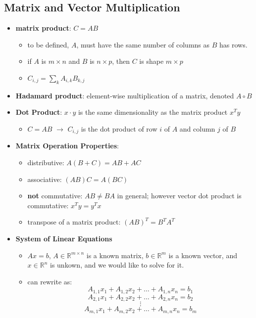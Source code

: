 \subsection{Matrix and Vector Multiplication}
\begin{itemize}
    \item \textbf{matrix product}: $C = AB$
    \begin{itemize}
        \item to be defined, $A$, must have the same number of columns as $B$ has rows.
        \item if $A$ is $m \times n$ and $B$ is $n \times p$, then $C$ is shape $m \times p$
        \item $C_{i,j} = \sum_k A_{i,k} B_{k,j}$
    \end{itemize}
    \item \textbf{Hadamard product}: element-wise multiplication of a matrix, denoted $A \circ B$
    \item \textbf{Dot Product}: $x \cdot y$ is the same dimensionality as the matrix product $x^T y$
    \begin{itemize}
        \item $C = AB$ $\rightarrow$ $C_{i,j}$ is the dot product of row $i$ of $A$ and column $j$ of $B$ 
    \end{itemize}
    \item \textbf{Matrix Operation Properties}:
    \begin{itemize}
        \item distributive: $A(B + C) = AB + AC$
        \item associative: $(AB)C = A(BC)$
        \item \textbf{not} commutative: $AB \neq BA$ in general; however vector dot product is commutative: $x^T y = y^T x$
        \item transpose of a matrix product: $(AB)^T = B^T A^T$
    \end{itemize}
    \item \textbf{System of Linear Equations}
    \begin{itemize}
        \item $Ax=b$, $A \in \mathbb{R}^{m \times n}$ is a known matrix, $b \in \mathbb{R}^m$ is a known vector, and $x \in \mathbb{R}^n$ is unkown, and we would like to solve for it.
        \item can rewrite as: $$A_{1,1}x_1 + A_{1,2}x_2 + \dots + A_{1, n}x_n = b_1$$
        $$A_{2,1}x_1 + A_{2,2}x_2 + \dots + A_{2, n}x_n = b_2$$ 
        $$\vdots$$
        $$A_{m,1}x_1 + A_{m,2}x_2 + \dots + A_{m, n}x_n = b_m$$
    \end{itemize}
\end{itemize}